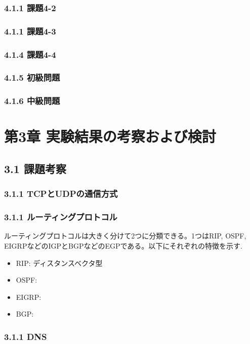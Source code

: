 \documentclass[12pt]{jreport}
\begin{document}
            \subsection*{4.1.1  課題4-2}
            \subsection*{4.1.1  課題4-3}
            \subsection*{4.1.4  課題4-4}
            \subsection*{4.1.5  初級問題}
            \subsection*{4.1.6  中級問題}

    \chapter*{第3章 実験結果の考察および検討}
            \section*{3.1 課題考察}
                \subsection*{3.1.1 TCPとUDPの通信方式}
                \subsection*{3.1.1 ルーティングプロトコル}
                    ルーティングプロトコルは大きく分けて2つに分類できる。1つはRIP, OSPF, EIGRPなどのIGPとBGPなどのEGPである。以下にそれぞれの特徴を示す.
                    \begin{itemize}
                    \item RIP: ディスタンスベクタ型
                    \item OSPF: 
                    \item EIGRP: 
                    \item BGP: 
                \end{itemize}
                \subsection*{3.1.1 DNS}
\end{document}
